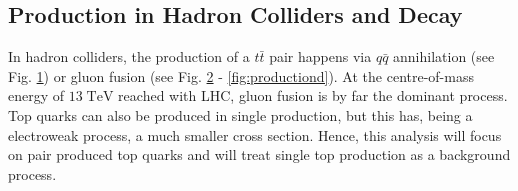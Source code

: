 	\subsection{Production in Hadron Colliders and Decay}
	In hadron colliders, the production of a $t\bar{t}$ pair happens via $q\bar{q}$ annihilation (see Fig. \ref{fig:productiona}) or gluon fusion (see Fig. \ref{fig:productionb} - \ref{fig:productiond}). At the centre-of-mass energy of $13\;\text{TeV}$ reached with LHC, gluon fusion is by far the dominant process. Top quarks can also be produced in single production, but this has, being a electroweak process, a much smaller cross section. Hence, this analysis will focus on pair produced top quarks and will treat single top production as a background process.
	\begin{figure}
		\centering
		\begin{subfigure}{.4\textwidth}
		\caption{}
		\label{fig:productiona}
		\end{subfigure}
		\begin{subfigure}{.4\textwidth}
		\caption{}
		\label{fig:productionb}
		\end{subfigure}		
		\begin{subfigure}{.4\textwidth}
\end{subfigure}
\end{figure}
